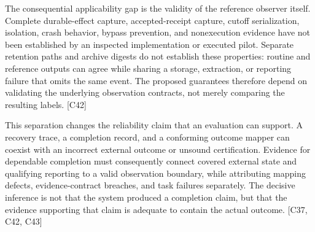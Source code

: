 \documentclass[11pt]{article}
\begin{document}
The consequential applicability gap is the validity of the reference observer itself. Complete durable-effect capture, accepted-receipt capture, cutoff serialization, isolation, crash behavior, bypass prevention, and nonexecution evidence have not been established by an inspected implementation or executed pilot. Separate retention paths and archive digests do not establish these properties: routine and reference outputs can agree while sharing a storage, extraction, or reporting failure that omits the same event. The proposed guarantees therefore depend on validating the underlying observation contracts, not merely comparing the resulting labels. [C42]

This separation changes the reliability claim that an evaluation can support. A recovery trace, a completion record, and a conforming outcome mapper can coexist with an incorrect external outcome or unsound certification. Evidence for dependable completion must consequently connect covered external state and qualifying reporting to a valid observation boundary, while attributing mapping defects, evidence-contract breaches, and task failures separately. The decisive inference is not that the system produced a completion claim, but that the evidence supporting that claim is adequate to contain the actual outcome. [C37, C42, C43]
\end{document}
